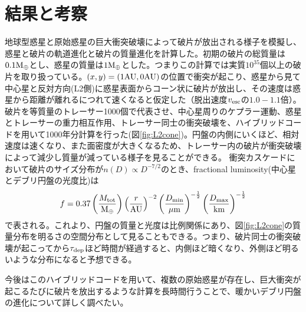 \documentclass[a4paper,10pt,oneside,twocolumn,notitlepage,final]{jarticle}
\begin{document}

\section{結果と考察}
地球型惑星と原始惑星の巨大衝突破壊によって破片が放出される様子を模擬し、惑星と破片の軌道進化と破片の質量進化を計算した。初期の破片の総質量は$0.1 {\rm M_{\oplus}}$とし、惑星の質量は$1 {\rm M_{\oplus}}$とした。つまりこの計算では実質$10^{35}$個以上の破片を取り扱っている。$(x,y) = (1 {\rm AU},0 {\rm AU})$の位置で衝突が起こり、惑星から見て中心星と反対方向(L2側)に惑星表面からコーン状に破片が放出し、その速度は惑星から距離が離れるにつれて速くなると仮定した（脱出速度$v_{\rm esc}$の$1.0-1.1$倍）。破片を等質量のトレーサー1000個で代表させ、中心星周りのケプラー運動、惑星とトレーサーの重力相互作用、トレーサー同士の衝突破壊を、ハイブリッドコードを用いて1000年分計算を行った(図\ref{fig:L2cone})。円盤の内側にいくほど、相対速度は速くなり、また面密度が大きくなるため、トレーサー内の破片が衝突破壊によって減少し質量が減っている様子を見ることができる。
衝突カスケードにおいて破片のサイズ分布が$n(D) \propto D^{-7/2}$のとき、fractional luminosity(中心星とデブリ円盤の光度比)は
\begin{align}
 f = 0.37 \left(\frac{M_{\rm tot}}{\rm M_{\oplus}}\right) \left(\frac{r}{\rm AU}\right)^{-2} \left(\frac{D_{\rm min}}{\rm \mu m}\right)^{-\frac{1}{2}} \left(\frac{D_{\rm max}}{\rm km}\right)^{-\frac{1}{2}}
\end{align}
で表される\citep{Jackson2012}。これより、円盤の質量と光度は比例関係にあり、図\ref{fig:L2cone}の質量分布を明るさの空間分布として見ることもできる。つまり、破片同士の衝突破壊が起こってから$\tau_{\rm dep}$ほど時間が経過すると、内側ほど暗くなり、外側ほど明るいような分布になると予想できる。

今後はこのハイブリッドコードを用いて、複数の原始惑星が存在し、巨大衝突が起こるたびに破片を放出するような計算を長時間行うことで、暖かいデブリ円盤の進化について詳しく調べたい。


\end{document}
